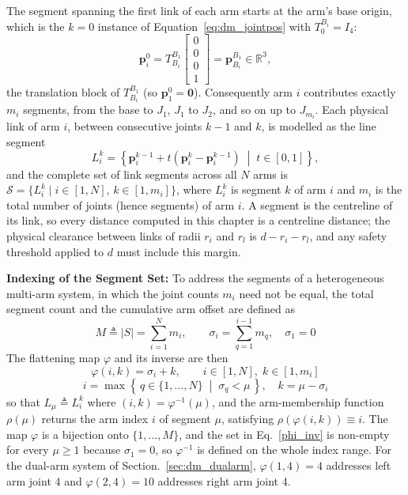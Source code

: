 The segment spanning the first link of each arm starts at the arm's base origin, which is the
$k=0$ instance of Equation~\eqref{eq:dm_jointpos} with $T^{B_i}_{0} = I_4$:
\begin{equation}
\mathbf{p}_i^{0} = T^{B_1}_{B_i}\begin{bmatrix} 0 \\ 0 \\ 0 \\ 1 \end{bmatrix} = \mathbf{p}^{B_1}_{B_i} \in \mathbb{R}^3,
\label{eq:dm_baseanchor}
\end{equation}
the translation block of $T^{B_1}_{B_i}$ (so $\mathbf{p}_1^0 = \mathbf{0}$). Consequently arm $i$
contributes exactly $m_i$ segments, from the base to $J_1$, $J_1$ to $J_2$, and so on up to
$J_{m_i}$. Each physical link of arm $i$, between consecutive joints $k-1$ and $k$, is modelled as
the line segment
\begin{equation}
L_i^k = \left\{ \mathbf{p}_i^{k-1} + t\left( \mathbf{p}_i^k - \mathbf{p}_i^{k-1} \right) \;\middle|\; t \in [0,1] \right\},
\label{eq:dm_segment}
\end{equation}
and the complete set of link segments across all $N$ arms is
$\mathcal{S} = \{ L_i^k \mid i \in [1,N],\, k \in [1,m_i] \}$, where $L_i^k$ is segment $k$ of arm $i$
and $m_i$ is the total number of joints (hence segments) of arm $i$. A segment is the centreline of
its link, so every distance computed in this chapter is a centreline distance; the physical clearance
between links of radii $r_i$ and $r_l$ is $d - r_i - r_l$, and any safety threshold applied to $d$
must include this margin.

\noindent\textbf{Indexing of the Segment Set:} To address the segments of a heterogeneous multi-arm system, in which the joint counts $m_i$ need not be equal, the total segment count and the cumulative arm offset are defined as
\begin{equation}
M \triangleq |{S}| = \sum_{i=1}^{N} m_i, \qquad
\sigma_i = \sum_{q=1}^{i-1} m_q, \quad \sigma_1 = 0
\label{seg_count}
\end{equation}
The flattening map $\varphi$ and its inverse are then
\begin{equation}
\varphi(i,k) = \sigma_i + k, \qquad i \in [1,N], \; k \in [1,m_i]
\label{phi_map}
\end{equation}
\begin{equation}
i = \max\left\{\, q \in \{1,\ldots,N\} \;\middle|\; \sigma_q < \mu \,\right\}, \quad k = \mu - \sigma_i
\label{phi_inv}
\end{equation}
so that $L_\mu \triangleq L_i^k$ where $(i,k) = \varphi^{-1}(\mu)$, and the arm-membership function $\rho(\mu)$ returns the arm index $i$ of segment $\mu$, satisfying $\rho(\varphi(i,k)) \equiv i$. The map $\varphi$ is a bijection onto $\{1,\ldots,M\}$, and the set in Eq.~\ref{phi_inv} is non-empty for every $\mu \geq 1$ because $\sigma_1 = 0$, so $\varphi^{-1}$ is defined on the whole index range. For the dual-arm system of Section.~\ref{sec:dm_dualarm}, $\varphi(1,4) = 4$ addresses left arm joint 4 and $\varphi(2,4) = 10$ addresses right arm joint 4.

